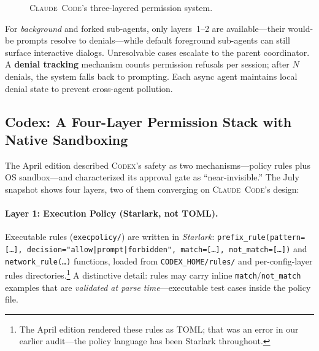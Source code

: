 \documentclass[11pt,a4paper]{article}
\newcommand{\clcode}{\textsc{Claude~Code}\xspace}
\newcommand{\cdx}{\textsc{Codex}\xspace}
\begin{document}
\begin{figure}[H]
\centering
{}
\caption{\clcode{}'s three-layered permission system.}
\label{fig:safety}
\end{figure}

For \emph{background} and forked sub-agents, only layers~1--2 are available---their would-be prompts resolve to denials---while default foreground sub-agents can still surface interactive dialogs.
Unresolvable cases escalate to the parent coordinator.
A \textbf{denial tracking} mechanism counts permission refusals per session; after $N$ denials, the system falls back to prompting.
Each async agent maintains local denial state to prevent cross-agent pollution.

\subsection{Codex: A Four-Layer Permission Stack with Native Sandboxing}

The April edition described \cdx{}'s safety as two mechanisms---policy rules plus OS sandbox---and characterized its approval gate as ``near-invisible.''
The July snapshot shows four layers, two of them converging on \clcode{}'s design:

\paragraph{Layer 1: Execution Policy (Starlark, not TOML).}
Executable rules (\texttt{execpolicy/}) are written in \emph{Starlark}: \texttt{prefix\_rule(pattern=[\ldots], decision="allow|prompt|forbidden", match=[\ldots], not\_match=[\ldots])} and \texttt{network\_rule(\ldots)} functions, loaded from \texttt{CODEX\_HOME/rules/} and per-config-layer rules directories.\footnote{The April edition rendered these rules as TOML; that was an error in our earlier audit---the policy language has been Starlark throughout.}
A distinctive detail: rules may carry inline \texttt{match}/\texttt{not\_match} examples that are \emph{validated at parse time}---executable test cases inside the policy file.
\end{document}
